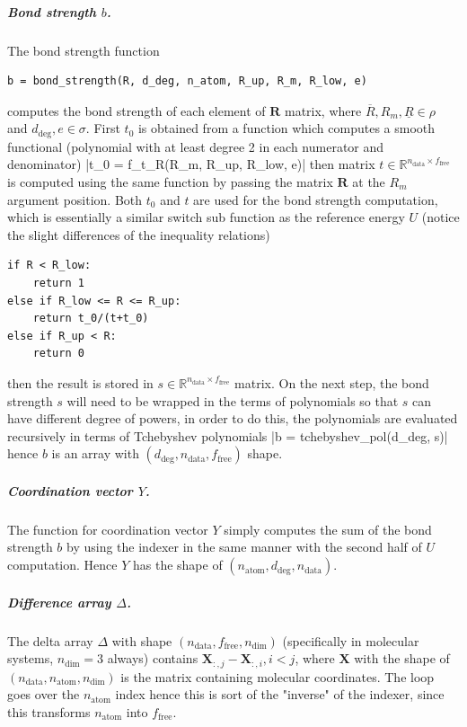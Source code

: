 \documentclass[12pt]{article}
\begin{document}
\subparagraph{Bond strength $b$.}
The bond strength function
\begin{verbatim}
b = bond_strength(R, d_deg, n_atom, R_up, R_m, R_low, e)
\end{verbatim}
\noindent computes the bond strength of each element of $\textbf{R}$ matrix, where $\overline{R}, R_m, \underline{R} \in \rho$ and $d_\text{deg}, e \in \sigma$. First $t_0$ is obtained from a function which computes a smooth functional (polynomial with at least degree 2 in each numerator and denominator)
|t_0 = f_t_R(R_m, R_up, R_low, e)|
\noindent then matrix $t \in \mathbb{R}^{n_\text{data} \times f_\text{free}}$ is computed using the same function by passing the matrix $\textbf{R}$ at the $R_m$ argument position. Both $t_0$ and $t$ are used for the bond strength computation, which is essentially a similar switch sub function as the reference energy $U$ (notice the slight differences of the inequality relations)
\begin{verbatim}
if R < R_low:
    return 1
else if R_low <= R <= R_up:
    return t_0/(t+t_0)
else if R_up < R:
    return 0
\end{verbatim}
then the result is stored in $s \in \mathbb{R}^{n_\text{data} \times f_\text{free}}$ matrix. On the next step, the bond strength $s$ will need to be wrapped in the terms of polynomials so that $s$ can have different degree of powers, in order to do this, the polynomials are evaluated recursively in terms of Tchebyshev polynomials
|b = tchebyshev_pol(d_deg, s)|
\noindent hence $b$ is an array with $(d_\text{deg}, n_\text{data}, f_\text{free})$ shape.

\subparagraph{Coordination vector $Y$.}
The function for coordination vector $Y$ simply computes the sum of the bond strength $b$ by using the indexer in the same manner with the second half of $U$ computation. Hence $Y$ has the shape of $(n_\text{atom}, d_\text{deg}, n_\text{data})$.

\subparagraph{Difference array $\Delta$.}
The delta array $\Delta$ with shape $(n_\text{data}, f_\text{free}, n_\text{dim})$ (specifically in molecular systems, $n_\text{dim} = 3$ always) contains $\textbf{X}_{:,j} - \textbf{X}_{:,i}, i<j$, where $\textbf{X}$ with the shape of $(n_\text{data}, n_\text{atom}, n_\text{dim})$ is the matrix containing molecular coordinates. The loop goes over the $n_\text{atom}$ index hence this is sort of the "inverse" of the indexer, since this transforms $n_\text{atom}$ into $f_\text{free}$.
\end{document}
